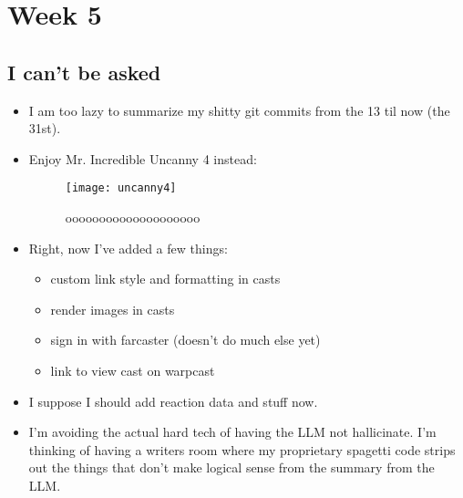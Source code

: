 \newpage
\section{Week 5}
\subsection*{I can't be asked}
\begin{itemize}
    \item I am too lazy to summarize my shitty git commits from the 13 til now
        (the 31st).
    \item Enjoy Mr. Incredible Uncanny 4 instead:
    \begin{figure}[ht]
        \centering
        \texttt{[image: uncanny4]}
        \captionsetup{labelfont=bf, textfont=it}
        \caption{oooooooooooooooooooo}
        \label{fig:uncanny4}
    \end{figure}
    \item Right, now I've added a few things:
        \begin{itemize}
            \item custom link style and formatting in casts 
            \item render images in casts
            \item sign in with farcaster (doesn't do much else yet)
            \item link to view cast on warpcast 
        \end{itemize}
    \item I suppose I should add reaction data and stuff now.
    \item I'm avoiding the actual hard tech of having the LLM not hallicinate.
        I'm thinking of having a writers room where my proprietary spagetti code
        strips out the things that don't make logical sense from the summary
        from the LLM.
\end{itemize}

